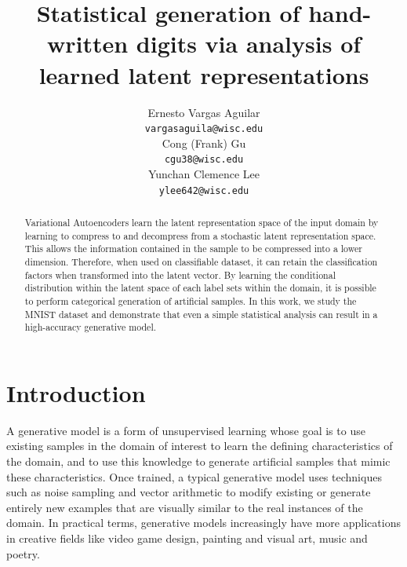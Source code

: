 \documentclass{article}
\title{Statistical generation of hand-written digits via analysis of learned latent representations}
\author{
  Ernesto Vargas Aguilar \\
  \texttt{vargasaguila@wisc.edu} \\
   \And
   Cong (Frank) Gu \\
   \texttt{cgu38@wisc.edu} \\
   \And
   Yunchan Clemence Lee \\
   \texttt{ylee642@wisc.edu} \\
}
\begin{document}

\maketitle

\begin{abstract}
Variational Autoencoders learn the latent representation space of the input domain by learning to compress to and decompress from a stochastic latent representation space. This allows the information contained in the sample to be compressed into a lower dimension. Therefore, when used on classifiable dataset, it can retain the classification factors when transformed into the latent vector. By learning the conditional distribution within the latent space of each label sets within the domain, it is possible to perform categorical generation of artificial samples. In this work, we study the MNIST dataset and demonstrate that even a simple statistical analysis can result in a high-accuracy generative model.
\end{abstract}

\section{Introduction}

A generative model is a form of unsupervised learning whose goal is to use existing 
samples in the domain of interest to learn the defining characteristics of the domain,
and to use this knowledge to generate artificial samples that mimic these characteristics.
Once trained, a typical generative model uses techniques such as noise sampling and vector arithmetic
to modify existing or generate entirely new examples that are visually similar to the real instances of the domain.
In practical terms, generative models increasingly have more applications in creative fields like video game design, 
painting and visual art, music and poetry. \par
\end{document}
